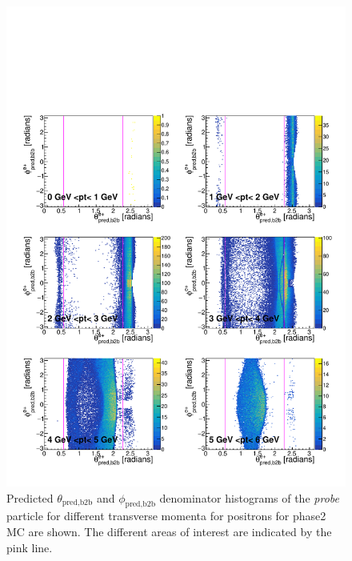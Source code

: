 \documentclass[a4paper,11pt,twosided,final,german,openbib,pdftex,listof=totoc,bibliography=totoc]{scrbook}
\begin{document}
\begin{appendix}
\begin{figure}[h!]
	\includegraphics[width=\textwidth]{Plots/master/RTPtMepE_MC.pdf}
	\caption[Enumerator $\theta_{\textrm{pred,b2b}}$-$\phi_{\textrm{pred,b2b}}$ Positron Transverse Momentum Phase2 MC]{Predicted $\theta_{\textrm{pred,b2b}}$ and $\phi_{\textrm{pred,b2b}}$ denominator histograms of the \textit{probe} particle for different transverse momenta for positrons for phase2 MC are shown. The different areas of interest are indicated by the pink line.}
	\label{plt:RTtPMepD_MC}
\end{figure}


\end{appendix}
\end{document}
